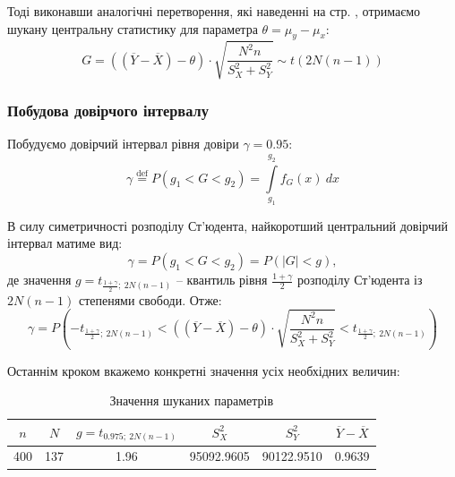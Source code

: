 Тоді виконавши аналогічні перетворення, які наведенні на стр. \pageref{seaching central statistic}, 
отримаємо шукану центральну статистику для параметра $\theta=\mu_y-\mu_x:$
\begin{equation*}
    G=\left((\overline{Y}-\overline{X})-\theta\right)\cdot 
    \sqrt{\frac{N^2n}{S_X^2+S_Y^2}}\sim t\left(2N(n-1)\right)
\end{equation*}

\subsubsection*{Побудова довірчого інтервалу}

Побудуємо довірчий інтервал рівня довіри $\gamma=0.95:$
\[ \gamma \overset{\mathrm{def}}{=} P(g_1<G<g_2)=\int\limits_{g_1}^{g_2}f_G(x)\ dx  \] 

В силу симетричності розподілу Ст'юдента, найкоротший центральний довірчий інтервал матиме вид:
\begin{equation*}
    \gamma = P(g_1<G<g_2)=P(|G|<g),
\end{equation*}
де значення $g=t_{\tfrac{1+\gamma}{2};\ 2N(n-1)}$ -- квантиль рівня $\frac{1+\gamma}{2}$ розподілу Ст'юдента із 
$2N(n-1)$ степенями свободи. Отже:
\begin{equation}
    \gamma = P\left(-t_{\tfrac{1+\gamma}{2};\ 2N(n-1)} < \left((\overline{Y}-\overline{X})-\theta\right)\cdot 
    \sqrt{\frac{N^2n}{S_X^2+S_Y^2}} < t_{\tfrac{1+\gamma}{2};\ 2N(n-1)}\right) \label{formula: MATH trusted interval}
\end{equation}

Останнім кроком вкажемо конкретні значення усіх необхідних величин:

\vspace{0.8cm}
\begin{table}[H]
    \begin{center}
        \begin{tabular}{||c|c|c|c|c|c||}
            \hline
            $n$ & $N$ & $g=t_{0.975;\ 2N(n-1)}$ & $S_X^2$ & $S_Y^2$ & $\overline{Y}-\overline{X}$ \\
            \hline \hline
            400 & 137 & 1.96 & 95092.9605 & 90122.9510 & 0.9639 \\
            \hline
        \end{tabular}
        \caption{Значення шуканих параметрів}
        \label{table: MATH interval}
    \end{center}
\end{table}

